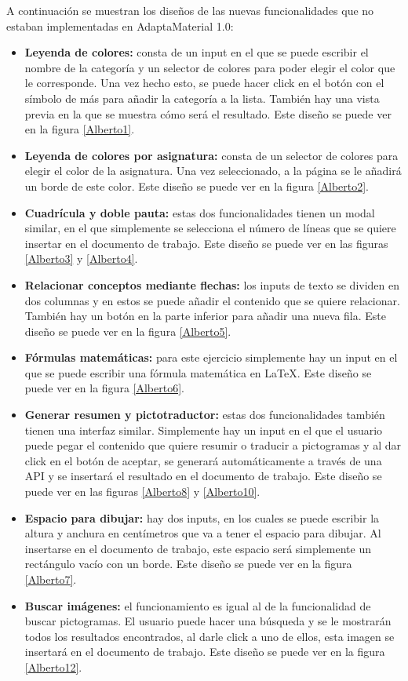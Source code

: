 A continuación se muestran los diseños de las nuevas funcionalidades que no estaban implementadas en AdaptaMaterial 1.0:

\begin{itemize}
  \item \textbf{Leyenda de colores:} consta de un input en el que se puede escribir el nombre de la categoría y un selector de colores para poder elegir el color que le corresponde. Una vez hecho esto, se puede hacer click en el botón con el símbolo de más para añadir la categoría a la lista. También hay una vista previa en la que se muestra cómo será el resultado. Este diseño se puede ver en la figura \ref{Alberto1}.
  \item \textbf{Leyenda de colores por asignatura:} consta de un selector de colores para elegir el color de la asignatura. Una vez seleccionado, a la página se le añadirá un borde de este color. Este diseño se puede ver en la figura \ref{Alberto2}.
  \item \textbf{Cuadrícula y doble pauta:} estas dos funcionalidades tienen un modal similar, en el que simplemente se selecciona el número de líneas que se quiere insertar en el documento de trabajo. Este diseño se puede ver en las figuras \ref{Alberto3} y \ref{Alberto4}.
  \item \textbf{Relacionar conceptos mediante flechas:} los inputs de texto se dividen en dos columnas y en estos se puede añadir el contenido que se quiere relacionar. También hay un botón en la parte inferior para añadir una nueva fila. Este diseño se puede ver en la figura \ref{Alberto5}.
  \item \textbf{Fórmulas matemáticas:} para este ejercicio simplemente hay un input en el que se puede escribir una fórmula matemática en LaTeX. Este diseño se puede ver en la figura \ref{Alberto6}.
  \item \textbf{Generar resumen y pictotraductor:} estas dos funcionalidades también tienen una interfaz similar. Simplemente hay un input en el que el usuario puede pegar el contenido que quiere resumir o traducir a pictogramas y al dar click en el botón de aceptar, se generará automáticamente a través de una API y se insertará el resultado en el documento de trabajo. Este diseño se puede ver en las figuras \ref{Alberto8} y \ref{Alberto10}.
  \item \textbf{Espacio para dibujar:} hay dos inputs, en los cuales se puede escribir la altura y anchura en centímetros que va a tener el espacio para dibujar. Al insertarse en el documento de trabajo, este espacio será simplemente un rectángulo vacío con un borde. Este diseño se puede ver en la figura \ref{Alberto7}.
  \item \textbf{Buscar imágenes:} el funcionamiento es igual al de la funcionalidad de buscar pictogramas. El usuario puede hacer una búsqueda y se le mostrarán todos los resultados encontrados, al darle click a uno de ellos, esta imagen se insertará en el documento de trabajo. Este diseño se puede ver en la figura \ref{Alberto12}.
\end{itemize}

